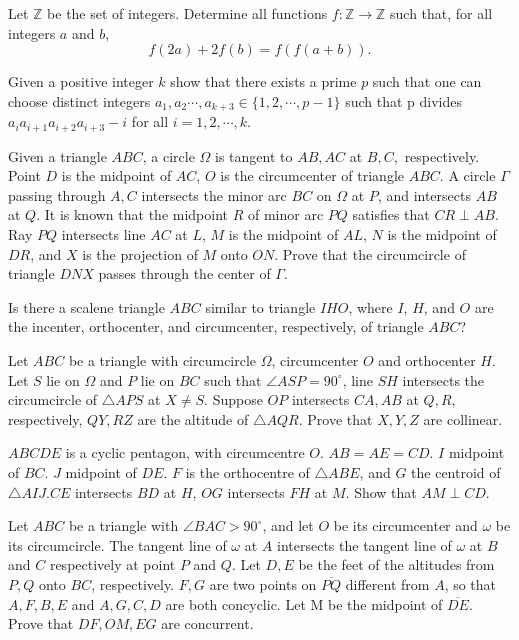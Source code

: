 \documentclass[11pt]{scrartcl}
\begin{document}
\begin{problem}[684265043263216]
Let $\mathbb{Z}$ be the set of integers. Determine all functions $f: \mathbb{Z} \rightarrow \mathbb{Z}$ such that, for all integers $a$ and $b$,$$f(2a)+2f(b)=f(f(a+b)).$$
\end{problem}
\begin{problem}[961350373727093]
Given a positive integer $k$ show that there exists a prime $p$ such that one can choose distinct integers $a_1,a_2\cdots, a_{k+3} \in \{1, 2, \cdots ,p-1\}$ such that p divides $a_ia_{i+1}a_{i+2}a_{i+3}-i$ for all $i= 1, 2, \cdots, k$.
\end{problem}
\begin{problem}[1222382895728709073]
	Given a triangle $ABC$, a circle $\Omega$ is tangent to $AB,AC$ at $B,C,$ respectively. Point $D$ is the midpoint of $AC$, $O$ is the circumcenter of triangle $ABC$. A circle $\Gamma$ passing through $A,C$ intersects the minor arc $BC$ on $\Omega$ at $P$, and intersects $AB$ at $Q$. It is known that the midpoint $R$ of minor arc $PQ$ satisfies that $CR \perp AB$. Ray $PQ$ intersects line $AC$ at $L$, $M$ is the midpoint of $AL$, $N$ is the midpoint of $DR$, and $X$ is the projection of $M$ onto $ON$. Prove that the circumcircle of triangle $DNX$ passes through the center of $\Gamma$.
\end{problem}
\begin{problem}[2672133756769464425]
Is there a scalene triangle $ABC$ similar to triangle $IHO$, where $I$, $H$, and $O$ are the incenter, orthocenter, and circumcenter, respectively, of triangle $ABC$?
\end{problem}
\begin{problem}[3417358984411200361]
Let $ABC$ be a triangle with circumcircle $\Omega$, circumcenter $O$ and orthocenter $H$. Let $S$ lie on $\Omega$ and $P$ lie on $BC$ such that $\angle ASP=90^\circ$, line $SH$ intersects the circumcircle of $\triangle APS$ at $X\neq S$. Suppose $OP$ intersects $CA,AB$ at $Q,R$, respectively, $QY,RZ$ are the altitude of $\triangle AQR$. Prove that $X,Y,Z$ are collinear.
\end{problem}
\begin{problem}[8811824418974048155]
$ABCDE$ is a cyclic pentagon, with circumcentre $O$. $AB=AE=CD$. $I$ midpoint of $BC$. $J$ midpoint of $DE$. $F$ is the orthocentre of $\triangle ABE$, and $G$ the centroid of $\triangle AIJ$.$CE$ intersects $BD$ at $H$, $OG$ intersects $FH$ at $M$. Show that $AM\perp CD$.
\end{problem}
\begin{problem}[571373387028298]
Let $ABC$ be a triangle with $\angle BAC > 90 ^{\circ}$, and let $O$ be its circumcenter and $\omega$ be its circumcircle. The tangent line of $\omega$ at $A$ intersects the tangent line of $\omega$ at $B$ and $C$ respectively at point $P$ and $Q$. Let $D,E$ be the feet of the altitudes from $P,Q$ onto $BC$, respectively. $F,G$ are two points on $\overline{PQ}$ different from $A$, so that $A,F,B,E$ and $A,G,C,D$ are both concyclic. Let M be the midpoint of $\overline{DE}$. Prove that $DF,OM,EG$ are concurrent.
\end{problem}
\end{document}
